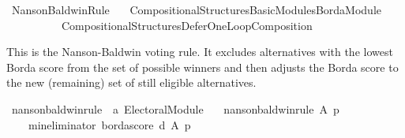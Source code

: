 %
\begin{isabellebody}%
%
%
\isadelimdocument
\isanewline
%
\endisadelimdocument
%
\isatagdocument
\isanewline
%
\isamarkuptrue%
%
\endisatagdocument
{\isafolddocument}%
%
\isadelimdocument
%
\endisadelimdocument
%
\isadelimtheory
%
\endisadelimtheory
%
\isatagtheory
{}\isamarkupfalse%
\ Nanson{\isacharunderscore}{\kern0pt}Baldwin{\isacharunderscore}{\kern0pt}Rule\isanewline
\ \ \ {\isachardoublequoteopen}Compositional{\isacharunderscore}{\kern0pt}Structures{\isacharslash}{\kern0pt}Basic{\isacharunderscore}{\kern0pt}Modules{\isacharslash}{\kern0pt}Borda{\isacharunderscore}{\kern0pt}Module{\isachardoublequoteclose}\isanewline
\ \ \ \ \ \ \ \ \ \ {\isachardoublequoteopen}Compositional{\isacharunderscore}{\kern0pt}Structures{\isacharslash}{\kern0pt}Defer{\isacharunderscore}{\kern0pt}One{\isacharunderscore}{\kern0pt}Loop{\isacharunderscore}{\kern0pt}Composition{\isachardoublequoteclose}\isanewline
{}%
\endisatagtheory
{\isafoldtheory}%
%
\isadelimtheory
%
\endisadelimtheory
%
\begin{isamarkuptext}%
This is the Nanson-Baldwin voting rule. It excludes alternatives with the
lowest Borda score from the set of possible winners and then adjusts the
Borda score to the new (remaining) set of still eligible alternatives.%
\end{isamarkuptext}\isamarkuptrue%
%
\isadelimdocument
%
\endisadelimdocument
%
\isatagdocument
%
\isamarkuptrue%
%
\endisatagdocument
{\isafolddocument}%
%
\isadelimdocument
%
\endisadelimdocument
{}\isamarkupfalse%
\ nanson{\isacharunderscore}{\kern0pt}baldwin{\isacharunderscore}{\kern0pt}rule\ {\isacharcolon}{\kern0pt}{\isacharcolon}{\kern0pt}\ {\isachardoublequoteopen}{\isacharprime}{\kern0pt}a\ Electoral{\isacharunderscore}{\kern0pt}Module{\isachardoublequoteclose}\ \isanewline
\ \ {\isachardoublequoteopen}nanson{\isacharunderscore}{\kern0pt}baldwin{\isacharunderscore}{\kern0pt}rule\ A\ p\ {\isacharequal}{\kern0pt}\isanewline
\ \ \ \ {\isacharparenleft}{\kern0pt}{\isacharparenleft}{\kern0pt}min{\isacharunderscore}{\kern0pt}eliminator\ borda{\isacharunderscore}{\kern0pt}score{\isacharparenright}{\kern0pt}\ {\isasymcirclearrowleft}\isactrlsub {\isasymexists}\isactrlsub {\isacharbang}{\kern0pt}\isactrlsub d{\isacharparenright}{\kern0pt}\ A\ p{\isachardoublequoteclose}\isanewline

\end{isabellebody}
